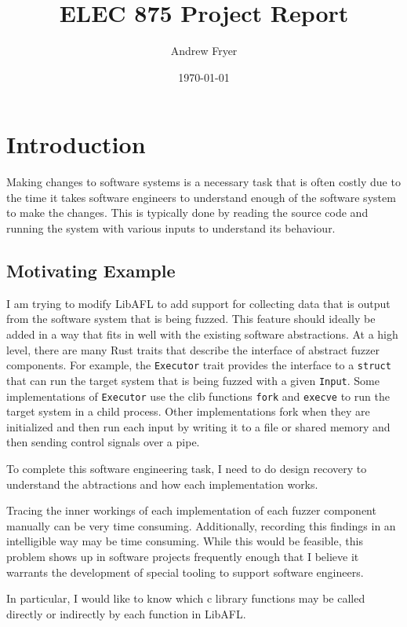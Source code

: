\documentclass[11pt]{article}
\title{ELEC 875 Project Report}
\author{Andrew Fryer}
\date{\today}
\begin{document}
\maketitle

\section{Introduction}

Making changes to software systems is a necessary task that is often costly due to the time it takes software engineers to understand enough of the software system to make the changes.
This is typically done by reading the source code and running the system with various inputs to understand its behaviour.

\subsection{Motivating Example}

I am trying to modify LibAFL to add support for collecting data that is output from the software system that is being fuzzed.
This feature should ideally be added in a way that fits in well with the existing software abstractions.
At a high level, there are many Rust traits that describe the interface of abstract fuzzer components.
For example, the \lstinline{Executor} trait provides the interface to a \lstinline{struct} that can run the target system that is being fuzzed with a given \lstinline{Input}.
Some implementations of \lstinline{Executor} use the clib functions \lstinline{fork} and \lstinline{execve} to run the target system in a child process.
Other implementations fork when they are initialized and then run each input by writing it to a file or shared memory and then sending control signals over a pipe.

To complete this software engineering task, I need to do design recovery to understand the abtractions and how each implementation works.

Tracing the inner workings of each implementation of each fuzzer component manually can be very time consuming.
Additionally, recording this findings in an intelligible way may be time consuming.
While this would be feasible, this problem shows up in software projects frequently enough that I believe it warrants the development of special tooling to support software engineers.

In particular, I would like to know which c library functions may be called directly or indirectly by each function in LibAFL.
\end{document}
